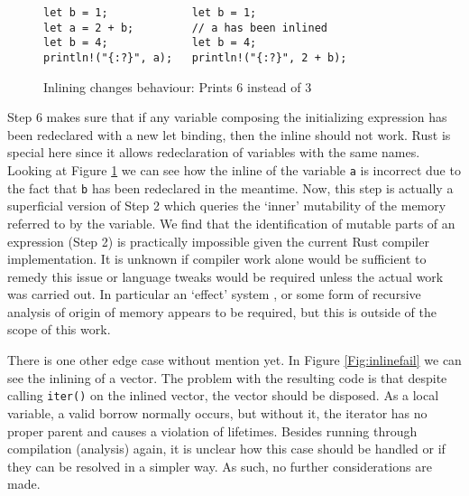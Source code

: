 \begin{figure}[h]
\begin{verbatim}
let b = 1;             let b = 1;
let a = 2 + b;         // a has been inlined
let b = 4;             let b = 4;
println!("{:?}", a);   println!("{:?}", 2 + b);
\end{verbatim}
\caption{Inlining changes behaviour: Prints 6 instead of 3}
\label{Fig:newlet}
\end{figure}

Step 6 makes sure that if any variable composing the initializing expression has been redeclared with a new let binding, then the inline should not work. Rust is special here since it allows redeclaration of variables with the same names. Looking at Figure \ref{Fig:newlet} we can see how the inline of the variable {\verb|a|} is incorrect due to the fact that {\verb|b|} has been redeclared in the meantime. Now, this step is actually a superficial version of Step 2 which queries the `inner' mutability of the memory referred to by the variable. We find that the identification of mutable parts of an expression (Step 2) is practically impossible given the current Rust compiler implementation. It is unknown if compiler work alone would be sufficient to remedy this issue or language tweaks would be required unless the actual work was carried out. In particular an `effect' system \cite{effects}, or some form of recursive analysis of origin of memory appears to be required, but this is outside of the scope of this work.


There is one other edge case without mention yet. In Figure \ref{Fig:inlinefail} we can see the inlining of a vector. The problem with the resulting code is that despite calling {\verb|iter()|} on the inlined vector, the vector should be disposed. As a local variable, a valid borrow normally occurs, but without it, the iterator has no proper parent and causes a violation of lifetimes. Besides running through compilation (analysis) again, it is unclear how this case should be handled or if they can be resolved in a simpler way. As such, no further considerations are made.

